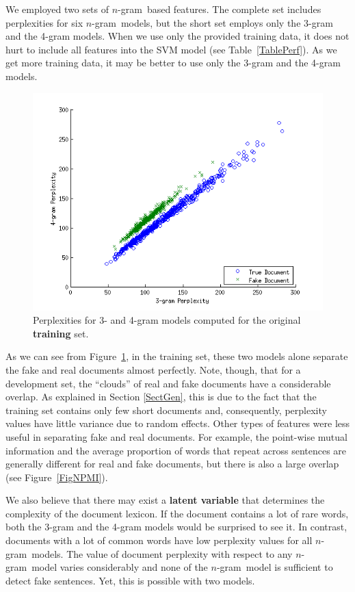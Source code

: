 \documentclass[11pt]{article}
\newcommand{\ngram}{\mbox{$n$-gram }}
\begin{document}
We employed two sets of \ngram based features. The complete set includes perplexities for six \ngram models,
but the short set employs only the 3-gram and the 4-gram models.
When we use only the provided training data, it does not hurt to include all features into the SVM
model (see Table~\ref{TablePerf}). As we get more training data, it may be better to use only
the 3-gram and the 4-gram models.

\begin{figure}\centering
\includegraphics[scale=0.5]{erroranalysisGram34.png}
\caption{Perplexities for 3- and 4-gram models computed for the original \textbf{training} set.\label{Fig1}}
\end{figure}

As we can see from Figure~\ref{Fig1},
in the training set,
these two models alone separate the fake and real documents almost perfectly.
Note, though, that for a development set, the ``clouds'' of real and fake documents have a considerable overlap.
 As explained in Section \ref{SectGen}, this is due to the fact that the training set
contains only few short documents and, consequently, perplexity values have little variance due to random effects.
Other types of features were less useful in separating fake and real documents. For example,
the point-wise mutual information 
and the average proportion of words that repeat across sentences are generally different for real and fake documents,
but there is also a large overlap (see Figure~\ref{FigNPMI}). 

We also believe that there may exist a \textbf{latent variable} that determines the complexity
of the document lexicon.
If the document contains a lot of rare words, both the 3-gram and the 4-gram models
would be surprised to see it. In contrast, documents with a lot of common words
have low perplexity values for all \ngram models.
The value of document perplexity with respect to any \ngram model varies considerably
and none of the \ngram model is sufficient to detect fake sentences.
Yet, this is possible with two models.
\end{document}

